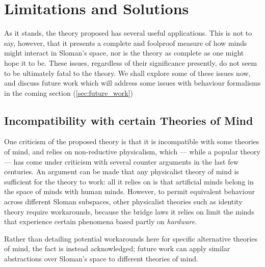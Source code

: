 \section{Limitations and Solutions}\label{sec:limitations}
As it stands, the theory proposed has several useful applications. This is not to say, however, that it presents a complete and foolproof measure of how minds might interact in Sloman's space, nor is the theory as complete as one might hope it to be. These issues, regardless of their significance presently, do not seem to be ultimately fatal to the theory. We shall explore some of these issues now, and discuss future work which will address some issues with behaviour formalisms in the coming section (\cref{sec:future_work})

\subsection{Incompatibility with certain Theories of Mind}\label{subsec:incompatibility}
One criticism of the proposed theory is that it is incompatible with some theories of mind, and relies on non-reductive physicalism, which --- while a popular theory --- has come under criticism with several counter arguments in the last few centuries. An argument can be made that any physicalist theory of mind is sufficient for the theory to work: all it relies on is that artificial minds belong in the space of minds with human minds. However, to permit equivalent behaviour across different Sloman subspaces, other physicalist theories such as identity theory require workarounds, because the bridge laws it relies on limit the minds that experience certain phenomena based partly on \emph{hardware}.\par

Rather than detailing potential workarounds here for specific alternative theories of mind, the fact is instead acknowledged; future work can apply similar abstractions over Sloman's space to different theories of mind.\par

